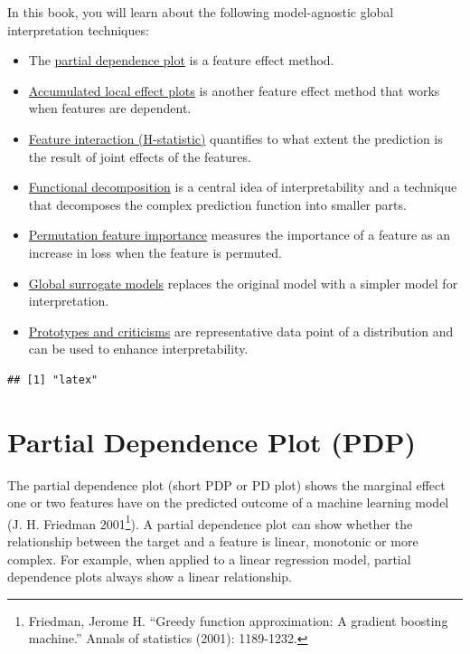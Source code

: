 \documentclass[
  11pt,
]{scrbook}
\providecommand{\tightlist}{%
  \setlength{\itemsep}{0pt}\setlength{\parskip}{0pt}}
\begin{document}
In this book, you will learn about the following model-agnostic global interpretation techniques:

\begin{itemize}
\tightlist
\item
  The \protect\hyperlink{pdp}{partial dependence plot} is a feature effect method.
\item
  \protect\hyperlink{ale}{Accumulated local effect plots} is another feature effect method that works when features are dependent.
\item
  \protect\hyperlink{interaction}{Feature interaction (H-statistic)} quantifies to what extent the prediction is the result of joint effects of the features.
\item
  \protect\hyperlink{decompostion}{Functional decomposition} is a central idea of interpretability and a technique that decomposes the complex prediction function into smaller parts.
\item
  \protect\hyperlink{feature-importance}{Permutation feature importance} measures the importance of a feature as an increase in loss when the feature is permuted.
\item
  \protect\hyperlink{global}{Global surrogate models} replaces the original model with a simpler model for interpretation.
\item
  \protect\hyperlink{proto}{Prototypes and criticisms} are representative data point of a distribution and can be used to enhance interpretability.
\end{itemize}

\begin{verbatim}
## [1] "latex"
\end{verbatim}

\newpage

\hypertarget{pdp}{%
\section{Partial Dependence Plot (PDP)}\label{pdp}}

The partial dependence plot (short PDP or PD plot) shows the marginal effect one or two features have on the predicted outcome of a machine learning model (J. H. Friedman 2001\footnote{Friedman, Jerome H. ``Greedy function approximation: A gradient boosting machine.'' Annals of statistics (2001): 1189-1232.}).
A partial dependence plot can show whether the relationship between the target and a feature is linear, monotonic or more complex.
For example, when applied to a linear regression model, partial dependence plots always show a linear relationship.
\end{document}
